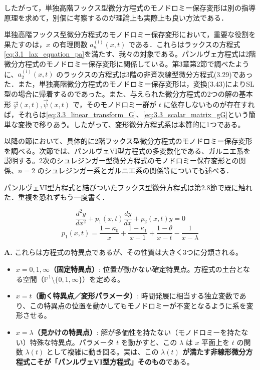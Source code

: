 したがって，単独高階フックス型微分方程式のモノドロミー保存変形は別の指導原理を求めて，別個に考察するのが理論上も実際上も良い方法である．

単独高階フックス型微分方程式のモノドロミー保存変形において，重要な役割を果たすのは，$x$ の有理関数 $a_n^{(l)}(x,t)$ である．これらはラックスの方程式\eqref{eq:3.1_lax_equation_pa}を満たす、我々の対象である。パンルヴェ方程式は2階微分方程式のモノドロミー保存変形に関係している。第3章第2節で調べたように、$a_2^{(l)}(x,t)$ のラックスの方程式は3階の非斉次線型微分方程式(3.29)であった．また，単独高階微分方程式のモノドロミー保存変形は，変換(3.43)によりSL型の場合に帰着するのであった。また、与えられた微分方程式の2つの解の基本形 $\vec{\varphi}(x,t), \vec{\psi}(x,t)$ で，そのモノドロミー群が $t$ に依存しないものが存在すれば，それらは\eqref{eq:3.3_linear_transform_G}、\eqref{eq:3.3_scalar_matrix_gG}という簡単な変換で移りあう。したがって、変形微分方程式系は本質的に1つである。

以降の節において、具体的に2階フックス型微分方程式のモノドロミー保存変形を調べる。次節では、パンルヴェVI型方程式の多変数化である、ガルニエ系を説明する。2次のシュレジンガー型微分方程式のモノドロミー保存変形との関係、$n=2$ のシュレジンガー系とガルニエ系の関係等についても述べる．

パンルヴェVI型方程式と結びついたフックス型微分方程式は第2.8節で既に触れた．重複を恐れずもう一度書く．

\begin{equation}\label{eq:3.4_2-PDE_x,t}
  \frac{d^2 y}{dx^2} + p_1(x,t)\frac{dy}{dx} + p_2(x,t)y = 0
\end{equation}
\begin{equation}\label{eq:3.4_PVI_coefficient_p1}
  p_1(x,t) = \frac{1-\kappa_0}{x} + \frac{1-\kappa_1}{x-1} + \frac{1-\theta}{x-t} - \frac{1}{x-\lambda}
\end{equation}

\begin{Q}[\eqref{eq:3.4_PVI_coefficient_p1}式における係数 $p_1(x,t)$ の極（特異点） $x = 0, 1, t, \lambda$ は、モノドロミー保存変形の理論においてそれぞれどのような幾何学的・解析的な役割を担っているか？]
\textbf{A.} これらは方程式の特異点であるが、その性質は大きく3つに分類される。
\begin{itemize}
    \item \textbf{$x = 0, 1, \infty$（固定特異点）}: 位置が動かない確定特異点。方程式の土台となる空間（$\mathbb{P}^1 \setminus \{0, 1, \infty\}$）を定める。
    \item \textbf{$x = t$（動く特異点／変形パラメータ）}: 時間発展に相当する独立変数であり、この特異点の位置を動かしてもモノドロミーが不変となるように系を変形させる。
    \item \textbf{$x = \lambda$（見かけの特異点）}: 解が多価性を持たない（モノドロミーを持たない）特殊な特異点。パラメータ $t$ を動かすと、この $\lambda$ は $x$ 平面上を $t$ の関数 $\lambda(t)$ として複雑に動き回る。実は、この \textbf{$\lambda(t)$ が満たす非線形微分方程式こそが「パンルヴェVI型方程式」そのもの}である。
\end{itemize}
\end{Q}

